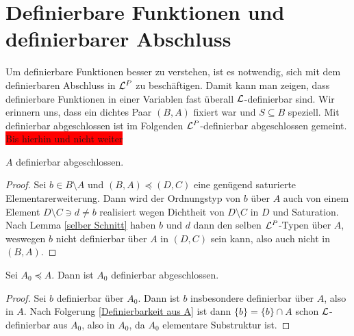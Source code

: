 \section{Definierbare Funktionen und definierbarer Abschluss}
Um definierbare Funktionen besser zu verstehen, ist es notwendig, sich mit dem definierbaren Abschluss in $\mathcal{L}^P$ zu beschäftigen. Damit kann man zeigen, dass definierbare Funktionen in einer Variablen \glqq{}fast überall\grqq{} $\mathcal{L}$-definierbar sind. Wir erinnern uns, dass ein dichtes Paar $(B,A)$ fixiert war und $S\subseteq B$ speziell. Mit \glqq{}definierbar abgeschlossen\grqq{} ist im Folgenden \glqq{}$\mathcal{L}^P$-definierbar abgeschlossen\grqq{} gemeint.
\colorbox{red}{Bis hierhin und nicht weiter}
\begin{lemma}\label{A definierbar abgeschl}
	$A$ definierbar abgeschlossen.
\end{lemma}
\begin{proof}
	Sei $b\in B\setminus A$ und $(B,A)\preceq(D,C)$ eine genügend saturierte Elementarerweiterung. Dann wird der Ordnungstyp von $b$ über $A$ auch von einem Element $D\setminus C\ni d\neq b$ realisiert wegen Dichtheit von $D\setminus C$ in $D$ und Saturation.\\
	Nach Lemma \ref{selber Schnitt} haben $b$ und $d$ dann den selben $\mathcal{L}^P$-Typen über $A$, weswegen $b$ nicht definierbar über $A$ in $(D,C)$ sein kann, also auch nicht in $(B,A)$.
\end{proof}

\begin{corollary}
	Sei $A_0\preceq A$. Dann ist $A_0$ definierbar abgeschlossen.
\end{corollary}
\begin{proof}
	Sei $b$ definierbar über $A_0$. Dann ist $b$ insbesondere definierbar über $A$, also in $A$. Nach Folgerung \ref{Definierbarkeit aus A} ist dann $\{b\}=\{b\}\cap A$ schon $\mathcal{L}$-definierbar aus $A_0$, also in $A_0$, da $A_0$ elementare Substruktur ist.
\end{proof}

